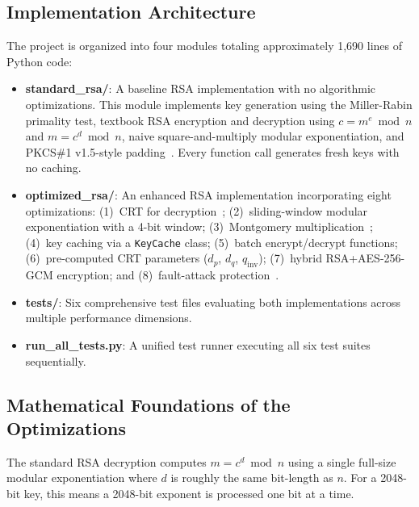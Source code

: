 \documentclass[journal]{IEEEtran}
\begin{document}
\subsection{Implementation Architecture}

The project is organized into four modules totaling approximately 1,690 lines of Python code:

\begin{itemize}
    \item \textbf{standard\_rsa/}: A baseline RSA implementation with no algorithmic optimizations. This module implements key generation using the Miller-Rabin primality test, textbook RSA encryption and decryption using $c = m^e \bmod n$ and $m = c^d \bmod n$, naive square-and-multiply modular exponentiation, and PKCS\#1 v1.5-style padding~\cite{pkcs1_2016}. Every function call generates fresh keys with no caching.

    \item \textbf{optimized\_rsa/}: An enhanced RSA implementation incorporating eight optimizations: (1)~CRT for decryption~\cite{garner1959}; (2)~sliding-window modular exponentiation with a 4-bit window; (3)~Montgomery multiplication~\cite{montgomery1985}; (4)~key caching via a \texttt{KeyCache} class; (5)~batch encrypt/decrypt functions; (6)~pre-computed CRT parameters ($d_p$, $d_q$, $q_{\mathrm{inv}}$); (7)~hybrid RSA+AES-256-GCM encryption; and (8)~fault-attack protection~\cite{boneh2001}.

    \item \textbf{tests/}: Six comprehensive test files evaluating both implementations across multiple performance dimensions.

    \item \textbf{run\_all\_tests.py}: A unified test runner executing all six test suites sequentially.
\end{itemize}

\subsection{Mathematical Foundations of the Optimizations}

The standard RSA decryption computes $m = c^d \bmod n$ using a single full-size modular exponentiation where $d$ is roughly the same bit-length as $n$. For a 2048-bit key, this means a 2048-bit exponent is processed one bit at a time.
\end{document}

